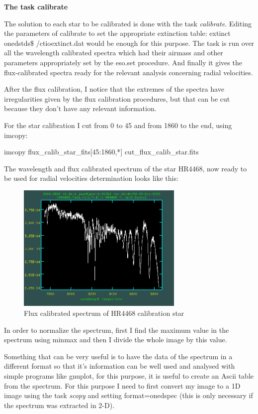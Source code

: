 \textbf{The task calibrate}

The solution to each star to be calibrated is done with the task \textit{calibrate}. Editing the parameters of calibrate to set the appropriate extinction table: extinct onedstds\$ /ctioextinct.dat would be enough for this purpose. The task is run over all the wavelength calibrated spectra which had their airmass and other parameters appropriately set by the eso.set procedure. And finally it gives the flux-calibrated spectra ready for the relevant analysis concerning radial velocities.

After the flux calibration, I notice that the extremes of the spectra have irregularities given by the flux calibration procedures, but that can be cut because they don't have any relevant information.

For the star calibration I cut from 0 to 45 and from 1860 to the end, using imcopy:

\begin{center}
imcopy flux\_calib\_star\_fits[45:1860,*] cut\_flux\_calib\_star.fits
\end{center}

The wavelength and flux calibrated spectrum of the star HR4468, now ready to be used for radial velocities determination looks like this:

\begin{figure}[H]
\centering
\includegraphics[width=8cm]{images/calib_star_flux.png}
\caption[Flux calibrated spectrum of HR4468]{Flux calibrated spectrum of HR4468 calibration star}
\end{figure}

In order to normalize the spectrum, first I find the maximum value in the spectrum using minmax and then I divide the whole image by this value. 

Something that can be very useful is to have the data of the spectrum in a different format so that it's information can be well used and analysed with simple programs like gnuplot, for this purpose, it is useful to create an Ascii table from the spectrum. For this purpose I need to first convert my image to a 1D image using the task \textit{scopy} and setting format=onedspec (this is only necessary if the spectrum was extracted in 2-D).


